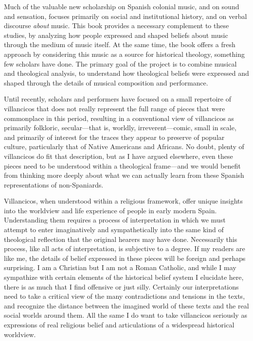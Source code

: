 Much of the valuable new scholarship on Spanish colonial music, and on sound
and sensation, focuses primarily on social and institutional history, and on
verbal discourse \emph{about} music.%
    \Autocites{Baker:Harmony}{BakerKnighton:MusicUrbanSociety}
    {Irving:Colonial}{RamosKittrell:PlayingCathedral}
    {DellAntonio:Listening}
This book provides a necessary complement to these studies, by analyzing how
people expressed and shaped beliefs about music through the medium of music
itself.
At the same time, the book offers a fresh approach by considering this music as
a source for historical theology, something few scholars have done.
The primary goal of the project is to combine musical and theological analysis,
to understand how theological beliefs were expressed and shaped through the
details of musical composition and performance.

Until recently, scholars and performers have focused on a small repertoire of
villancicos that does not really represent the full range of pieces
that were commonplace in this period, resulting in a conventional view of
villancicos as primarily folkloric, secular---that is, worldly,
irreverent---comic, small in scale, and primarily of interest for the traces
they appear to preserve of popular culture, particularly that of Native
Americans and Africans.
No doubt, plenty of villancicos do fit that description, but as I have argued
elsewhere, even these pieces need to be understood within a theological
frame---and we would benefit from thinking more deeply about what we can
actually learn from these Spanish representations of non-Spaniards.%
    \Autocite{Cashner:BuildingSociety}

Villancicos, when understood within a religious framework, offer unique
insights into the worldview and life experience of people in early modern
Spain.
Understanding them requires a process of interpretation in which we must
attempt to enter imaginatively and sympathetically into the same kind of
theological reflection that the original hearers may have done.
Necessarily this process, like all acts of interpretation, is subjective to a
degree.
If my readers are like me, the details of belief expressed in these pieces will 
be foreign and perhaps surprising.
I am a Christian but I am not a Roman Catholic, and while I may sympathize with
certain elements of the historical belief system I elucidate here, there is as
much that I find offensive or just silly.
Certainly our interpretations need to take a critical view of the many
contradictions and tensions in the texts, and recognize the distance between
the imagined world of these texts and the real social worlds around them. 
All the same I do want to take villancicos seriously as expressions of real
religious belief and articulations of a widespread historical worldview.

